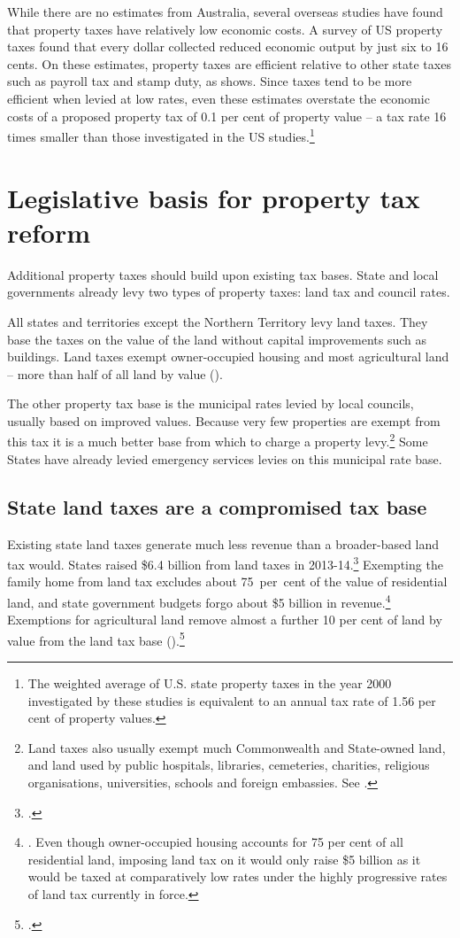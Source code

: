 \documentclass[twoside,english]{grattanBudgetRepairb5portrait}
\begin{document}
While there are no estimates from Australia, several overseas studies have found that property taxes have relatively low economic costs. A survey of US property taxes found that every dollar collected reduced economic output by just six to 16 cents. On these estimates, property taxes are efficient relative to other state taxes such as payroll tax and stamp duty, as  shows. Since taxes tend to be more efficient when levied at low rates, even these estimates overstate the economic costs of a proposed property tax of 0.1 per cent of property value – a tax rate 16 times smaller than those investigated in the US studies.\footnote{The weighted average of U.S. state property taxes in the year 2000 investigated by these studies is equivalent to an annual tax rate of 1.56 per cent of property values.}  

\chapter{Legislative basis for property tax reform\label{chapter:PROP-5}}
Additional property taxes should build upon existing tax bases. State and local governments already levy two types of property taxes: land tax and council rates. 

All states and territories except the Northern Territory levy land taxes. They base the taxes on the value of the land without capital improvements such as buildings.  Land taxes exempt owner-occupied housing and most agricultural land – more than half of all land by value (). 

The other property tax base is the municipal rates levied by local councils, usually based on improved values. Because very few properties are exempt from this tax it is a much better base from which to charge a property levy.\footnote{Land taxes also usually exempt much Commonwealth and State-owned land, and land used by public hospitals, libraries, cemeteries, charities, religious organisations, universities, schools and foreign embassies. See \textcite[][105]{productivity2008assessing}.}  Some States have already levied emergency services levies on this municipal rate base.

\section{State land taxes are a compromised tax base}
Existing state land taxes generate much less revenue than a broader-based land tax would. States raised \$6.4 billion from land taxes in 2013-14.\footcite{ABS2015h}  Exempting the family home from land tax excludes about 75~per~cent of the value of residential land, and state government budgets forgo about \$5 billion in revenue.\footnote{\textcites[][261]{HenryTaxReview2010}[][24]{KellyMaresHarrisonEtAl2013}. Even though owner-occupied housing accounts for 75 per cent of all residential land, imposing land tax on it would only raise \$5 billion as it would be taxed at comparatively low rates under the highly progressive rates of land tax currently in force.}  Exemptions for agricultural land remove almost a further 10 per cent of land by value from the land tax base ().\footcite[][260]{HenryTaxReview2010}
\end{document}
